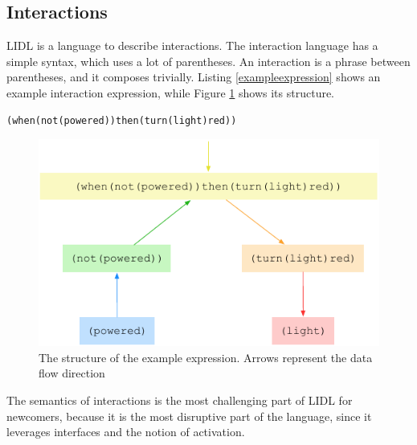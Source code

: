 \documentclass[10pt]{sigplanconf}
\begin{document}
\subsection{Interactions}

LIDL is a language to describe interactions. The interaction language has a simple syntax, which uses a lot of parentheses. An interaction is a phrase between parentheses, and it composes trivially. Listing \ref{exampleexpression} shows an example interaction expression, while Figure \ref{fig:example1} shows its structure.

\begin{lstlisting}[caption=An example interaction expression,label=exampleexpression]
(when(not(powered))then(turn(light)red))
\end{lstlisting}

\begin{figure}[h]
\centering
\includegraphics[width=\linewidth,height=\linewidth,keepaspectratio]{figures/example1.pdf}
\caption{The structure of the example expression. Arrows represent the data flow direction} 
\label{fig:example1}
\end{figure}


The semantics of interactions is the most challenging part of LIDL for newcomers, because it is the most disruptive part of the language, since it leverages interfaces and the notion of activation. 
\end{document}
